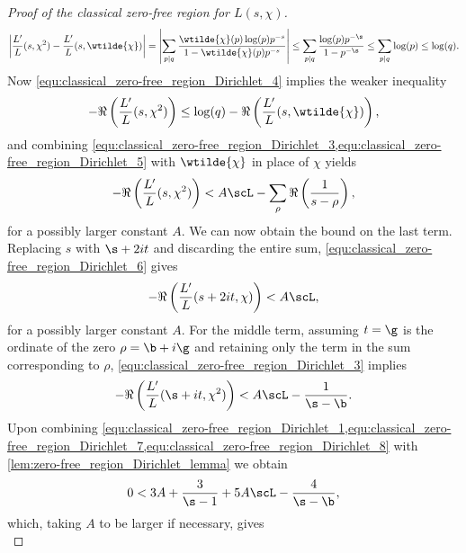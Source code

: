 \begin{proof}[Proof of the classical zero-free region for $L(s,\chi)$]
        \begin{equation}\label{equ:classical_zero-free_region_Dirichlet_4}
          \left|\frac{L'}{L}(s,\chi^{2})-\frac{L'}{L}(s,\wtilde{\chi})\right| = \left|\sum_{p \mid q}\frac{\wtilde{\chi}(p)\log(p)p^{-s}}{1-\wtilde{\chi}(p)p^{-s}}\right| \le \sum_{p \mid q}\frac{\log(p)p^{-\s}}{1-p^{-\s}} \le \sum_{p \mid q}\log(p) \le \log(q).
        \end{equation}
        Now \cref{equ:classical_zero-free_region_Dirichlet_4} implies the weaker inequality
        \begin{equation}\label{equ:classical_zero-free_region_Dirichlet_5}
          -\Re\left(\frac{L'}{L}(s,\chi^{2})\right) \le \log(q)-\Re\left(\frac{L'}{L}(s,\wtilde{\chi})\right),
        \end{equation}
        and combining \cref{equ:classical_zero-free_region_Dirichlet_3,equ:classical_zero-free_region_Dirichlet_5} with $\wtilde{\chi}$ in place of $\chi$ yields
        \begin{equation}\label{equ:classical_zero-free_region_Dirichlet_6}
            -\Re\left(\frac{L'}{L}(s,\chi^{2})\right) < A\scL-\sum_{\rho}\Re\left(\frac{1}{s-\rho}\right),
        \end{equation}
        for a possibly larger constant $A$. We can now obtain the bound on the last term. Replacing $s$ with $\s+2it$ and discarding the entire sum, \cref{equ:classical_zero-free_region_Dirichlet_6} gives
        \begin{equation}\label{equ:classical_zero-free_region_Dirichlet_7}
          -\Re\left(\frac{L'}{L}(s+2it,\chi)\right) < A\scL,
        \end{equation}
        for a possibly larger constant $A$. For the middle term, assuming $t = \g$ is the ordinate of the zero $\rho = \b+i\g$ and retaining only the term in the sum corresponding to $\rho$, \cref{equ:classical_zero-free_region_Dirichlet_3} implies
        \begin{equation}\label{equ:classical_zero-free_region_Dirichlet_8}
            -\Re\left(\frac{L'}{L}(\s+it,\chi^{2})\right) < A\scL-\frac{1}{\s-\b}.
        \end{equation}
        Upon combining \cref{equ:classical_zero-free_region_Dirichlet_1,equ:classical_zero-free_region_Dirichlet_7,equ:classical_zero-free_region_Dirichlet_8} with \cref{lem:zero-free_region_Dirichlet_lemma} we obtain
        \[
          0 < 3A+\frac{3}{\s-1}+5A\scL-\frac{4}{\s-\b},
        \]
        which, taking $A$ to be larger if necessary, gives
        \begin{equation}\label{equ:zero-free_region_estimate_Dirichlet_9}

\end{equation}
\end{proof}

